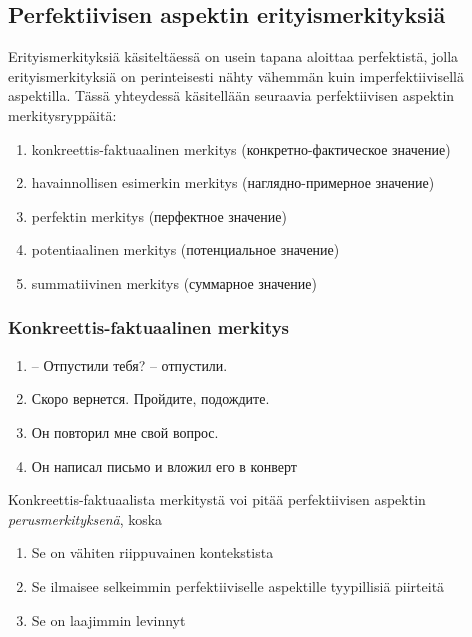 \documentclass[finnish,russian,]{article}
\begin{document}
\subsection{Perfektiivisen aspektin
erityismerkityksiä}\label{perfektiivisen-aspektin-erityismerkityksiuxe4}

Erityismerkityksiä käsiteltäessä on usein tapana aloittaa perfektistä,
jolla erityismerkityksiä on perinteisesti nähty vähemmän kuin
imperfektiivisellä aspektilla. Tässä yhteydessä käsitellään seuraavia
perfektiivisen aspektin merkitysryppäitä:

\begin{enumerate}
\def\labelenumi{\arabic{enumi}.}
\itemsep1pt\parskip0pt
\item
  konkreettis-faktuaalinen merkitys (конкретно-фактическое значение)
\item
  havainnollisen esimerkin merkitys (наглядно-примерное значение)
\item
  perfektin merkitys (перфектное значение)
\item
  potentiaalinen merkitys (потенциальное значение)
\item
  summatiivinen merkitys (суммарное значение)
\end{enumerate}

\subsubsection{Konkreettis-faktuaalinen
merkitys}\label{konkreettis-faktuaalinen-merkitys}

\begin{enumerate}
\def\labelenumi{(\arabic{enumi})}
\itemsep1pt\parskip0pt
\item
  -- Отпустили тебя? -- отпустили.\\
\item
  Скоро вернется. Пройдите, подождите.\\
\item
  Он повторил мне свой вопрос.\\
\item
  Он написал письмо и вложил его в конверт
\end{enumerate}

Konkreettis-faktuaalista merkitystä voi pitää perfektiivisen aspektin
\emph{perusmerkityksenä}, koska

\begin{enumerate}
\def\labelenumi{\alph{enumi}.}
\itemsep1pt\parskip0pt
\item
  Se on vähiten riippuvainen kontekstista
\item
  Se ilmaisee selkeimmin perfektiiviselle aspektille tyypillisiä
  piirteitä
\item
  Se on laajimmin levinnyt
\end{enumerate}
\end{document}
